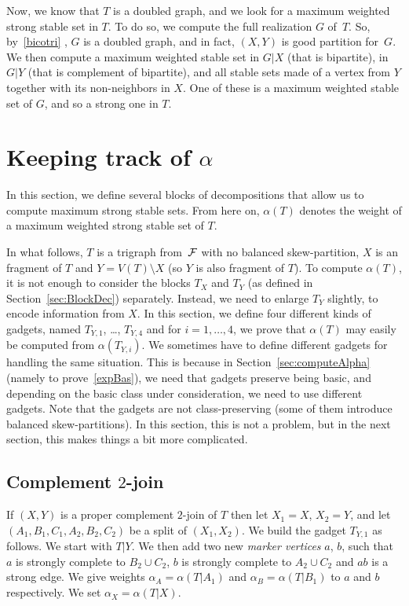 \documentclass[11 pt] {article}
\newcommand\blackslug{\hbox{\hskip 1pt \vrule width 4pt height 8pt depth 1.5pt
        \hskip 1pt}}
\newcommand\bbox{\hfill \quad \blackslug \medbreak}
\begin{document}
Now, we know that $T$ is a doubled graph, and we look for a maximum
weighted strong stable set in $T$.  To do so, we compute the full
realization $G$ of~$T$.  So, by~\ref{bicotri} , $G$ is a doubled graph,
and in fact, $(X, Y)$ is good partition for~$G$.  We then compute a
maximum weighted stable set in $G|X$ (that is bipartite), in $G|Y$
(that is complement of bipartite), and all stable sets made of a
vertex from $Y$ together with its non-neighbors in $X$.  One of these
is a maximum weighted stable set of $G$, and so a strong one in $T$.
\bbox

\section{Keeping track of $\alpha$}
\label{sec:decAlpha}

In this section, we define several blocks of decompositions that allow
us to compute maximum strong stable sets.  From here on, $\alpha (T)$
denotes the weight of a maximum weighted strong stable set of $T$.

In what follows, $T$ is a trigraph from~$\cal F$ with no balanced
skew-partition, $X$ is an fragment of $T$ and $Y = V(T) \setminus X$ (so
$Y$ is also fragment of $T$).  To compute $\alpha (T)$, it is not enough to
consider the blocks $T_X$ and $T_Y$ (as defined in
Section~\ref{sec:BlockDec}) separately.  Instead, we need to enlarge
$T_Y$ slightly, to encode information from $X$. In this section, we define four different kinds
of gadgets, named $T_{Y, 1}$, \dots, $T_{Y, 4}$ and for $i=1, \dots,
4$, we prove that $\alpha(T)$ may easily be computed from
$\alpha(T_{Y, i})$.  We sometimes have to define different gadgets for
handling the same situation.  This is because in
Section~\ref{sec:computeAlpha} (namely to prove~\ref{expBas}), we need
that gadgets preserve being basic, and depending on the basic class
under consideration, we need to use different gadgets.  Note that the
gadgets are not class-preserving (some of them introduce balanced
skew-partitions).  In this section, this is not a problem, but in the
next section, this makes things a bit more complicated.



\subsection{Complement $2$-join}
\label{ss:c2j}

If $(X, Y)$ is a proper complement $2$-join of $T$ then let $X_1=X$,
$X_2=Y$, and let $(A_1,B_1,C_1,A_2,B_2,C_2)$ be a split of $(X_1,
X_2)$.  We build the gadget $T_{Y,1}$ as follows.  We
start with $T |Y$. We then add two new \emph{marker vertices} $a$,
$b$, such that $a$ is strongly complete to $B_2\cup C_2$, $b$ is
strongly complete to $A_2 \cup C_2$ and $ab$ is a strong edge.  We give
weights $\alpha_A = \alpha(T|A_1)$ and $\alpha_B = \alpha(T|B_1)$ to
$a$ and $b$ respectively.  We set $\alpha_X = \alpha(T|X)$.
\end{document}
